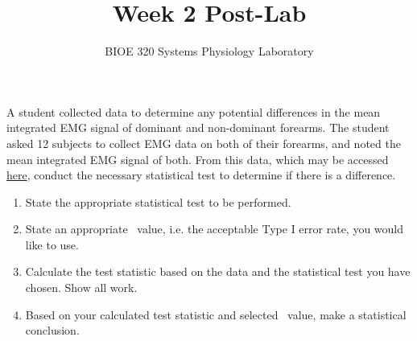 \documentclass{article}
\title{Week 2 Post-Lab}
\author{BIOE 320 Systems Physiology Laboratory}
\date{}
\begin{document}
\maketitle
\large

A student collected data to determine any potential differences in the mean integrated EMG signal of dominant and non-dominant forearms. The student asked 12 subjects to collect EMG data on both of their forearms, and noted the mean integrated EMG signal of both. From this data, which may be accessed \href{https://jameslong12.github.io/BIOE320/Assignments.html}{here}, conduct the necessary statistical test to determine if there is a difference.

\begin{enumerate}
	\item State the appropriate statistical test to be performed.
	\item State an appropriate \textalpha\ value, i.e. the acceptable Type I error rate, you would like to use. 
	\item Calculate the test statistic based on the data and the statistical test you have chosen. Show all work.
	\item Based on your calculated test statistic and selected \textalpha\ value, make a statistical conclusion.
\end{enumerate}
\end{document}
